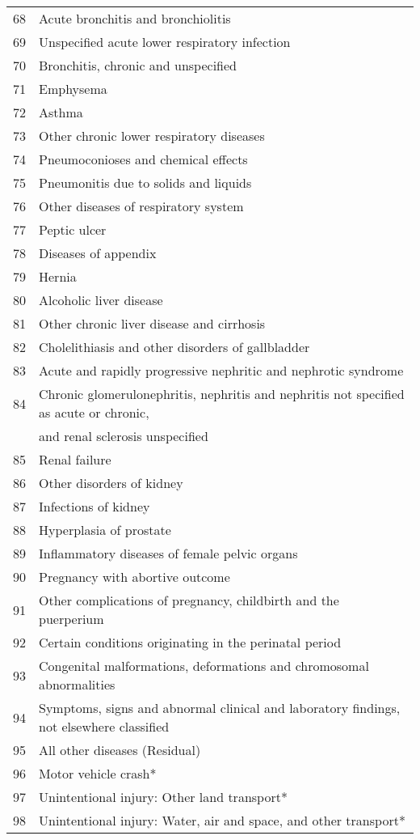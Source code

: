 \documentclass{article}
\begin{document}
\begin{center}
\begin{longtable}{|l|l|}
68&	Acute bronchitis and bronchiolitis\\
69&	Unspecified acute lower respiratory infection\\
70&	Bronchitis, chronic and unspecified\\
71&	Emphysema\\
72&	Asthma\\
73&	Other chronic lower respiratory diseases\\
74&	Pneumoconioses and chemical effects\\
75&	Pneumonitis due to solids and liquids\\
76&	Other diseases of respiratory system\\
77&	Peptic ulcer\\
78&	Diseases of appendix\\
79&	Hernia\\
80&	Alcoholic liver disease\\
81&	Other chronic liver disease and cirrhosis\\
82&	Cholelithiasis and other disorders of gallbladder\\
83&	Acute and rapidly progressive nephritic and nephrotic syndrome\\
84&	Chronic glomerulonephritis, nephritis and nephritis not specified as acute or chronic, \\
 &and renal sclerosis unspecified\\
85&	Renal failure\\
86&	Other disorders of kidney\\
87&	Infections of kidney\\
88&	Hyperplasia of prostate\\
89&	Inflammatory diseases of female pelvic organs\\
90&	Pregnancy with abortive outcome\\
91&	Other complications of pregnancy, childbirth and the puerperium\\
92&	Certain conditions originating in the perinatal period\\
93&	Congenital malformations, deformations and chromosomal abnormalities\\
94&	Symptoms, signs and abnormal clinical and laboratory findings, not elsewhere classified\\
95&	All other diseases (Residual)\\
96&	Motor vehicle crash*\\
97&	Unintentional injury: Other land transport*\\
98&	Unintentional injury: Water, air and space, and other transport*\\

\end{longtable}
\end{center}
\end{document}
